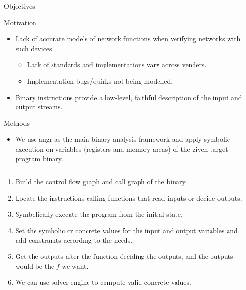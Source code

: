 \documentclass[final,hyperref={pdfpagelabels=false}]{beamer}
\begin{document}
\begin{frame}[t,fragile]
\begin{columns}[t]
\begin{column}{.465\textwidth}
\begin{block}{Objectives}
\end{block}


\begin{block}{Motivation}

\begin{itemize}
    \item Lack of accurate models of network functions when verifying networks
        with such devices.
        \begin{itemize}
            \item Lack of standards and implementations vary across venders.
            \item Implementation bugs/quirks not being modelled.
        \end{itemize}
    \item Binary instructions provide a low-level, faithful description of the
        input and output streams.
\end{itemize}

\end{block}


\begin{block}{Methods}

\begin{itemize}
    \item We use angr as the main binary analysis framework and apply symbolic
        execution on variables (registers and memory areas) of the given target
        program binary.
\end{itemize}

\begin{columns}

\begin{column}{.43\textwidth}
\begin{enumerate}
    \item Build the control flow graph and call graph of the binary.
    \item Locate the instructions calling functions that read inputs or decide
        outputs.
    \item Symbolically execute the program from the initial state.
    \item Set the symbolic or concrete values for the input and output variables
        and add constraints according to the needs.
    \item Get the outputs after the function deciding the outputs, and the
        outputs would be the $f$ we want.
    \item We can use solver engine to compute valid concrete values.
\end{enumerate}
\end{column}


\end{columns}
\end{block}
\end{column}
\end{columns}
\end{frame}
\end{document}
